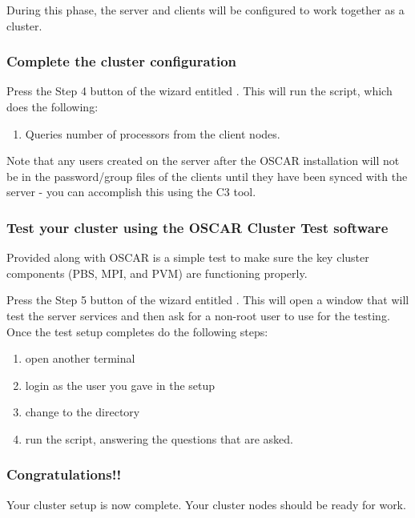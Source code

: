 During this phase, the server and clients will be configured to work
together as a cluster.

\subsubsection{Complete the cluster configuration}

Press the Step 4 button of the wizard entitled .  This will run the  script,
which does the following:

\begin{enumerate}
\item Queries number of processors from the client nodes.
  
\end{enumerate}

  Note that any users created on the server after the OSCAR
  installation will not be in the password/group files of the clients
  until they have been synced with the server - you can accomplish
  this using the C3  tool.


\subsubsection{Test your cluster using the OSCAR Cluster Test
  software}
            
Provided along with OSCAR is a simple test to make sure the key
cluster components (PBS, MPI, and PVM) are functioning properly. 

Press the Step 5 button of the wizard entitled . This will open a window that will test 
 the server services and then ask for a non-root user to use for the
 testing. Once the test setup completes do the following steps:
\begin{enumerate}
 \item open another terminal 
 \item login as the user you gave in the setup
 \item change to the  directory
 \item run the  script, answering the questions
 that are asked.
\end{enumerate}

\subsubsection{Congratulations!!}

Your cluster setup is now complete. Your cluster nodes should
be ready for work.

